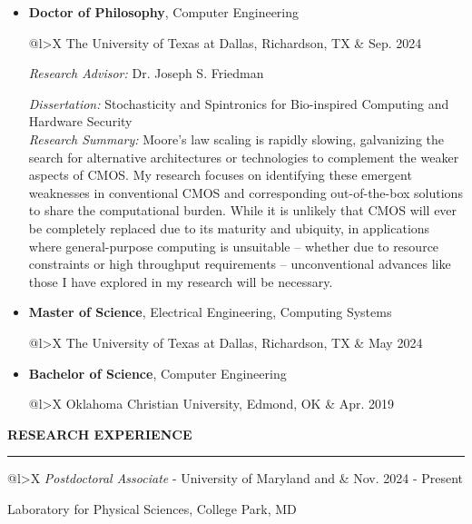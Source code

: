 \documentclass[12pt]{article}
\begin{document}
\begin{itemize}
    \item \textbf{Doctor of Philosophy}, Computer Engineering\\
    \begin{tabularx}{\linewidth}{{@{}l>{\raggedleft\arraybackslash}X}}
    The University of Texas at Dallas, Richardson, TX & Sep. 2024
    \end{tabularx}

    \textit{Research Advisor:} Dr. Joseph S. Friedman

    \textit{Dissertation:} Stochasticity and Spintronics for Bio-inspired Computing and Hardware Security\\
    \textit{Research Summary:} Moore’s law scaling is rapidly slowing, galvanizing the search for alternative architectures or technologies to complement the weaker aspects of CMOS.  My research focuses on identifying these emergent weaknesses in conventional CMOS and corresponding out-of-the-box solutions to share the computational burden.  While it is unlikely that CMOS will ever be completely replaced due to its maturity and ubiquity, in applications where general-purpose computing is unsuitable -- whether due to resource constraints or high throughput requirements -- unconventional advances like those I have explored in my research will be necessary.
    
    \item \textbf{Master of Science}, Electrical Engineering, Computing Systems\\
    \begin{tabularx}{\linewidth}{{@{}l>{\raggedleft\arraybackslash}X}}
  The University of Texas at Dallas, Richardson, TX     & May 2024 
    \end{tabularx}
    
    \item \textbf{Bachelor of Science}, Computer Engineering\\
    \begin{tabularx}{\linewidth}{{@{}l>{\raggedleft\arraybackslash}X}}
  Oklahoma Christian University, Edmond, OK & Apr. 2019 
    \end{tabularx}
\end{itemize}

\newpage

{\Large \textbf{RESEARCH EXPERIENCE}}

\textcolor{gray}{\rule{\textwidth}{2pt}}

\begin{tabularx}{\linewidth}{{@{}l>{\raggedleft\arraybackslash}X}}
  \textit{Postdoctoral Associate} - University of Maryland and      & Nov. 2024 - Present 
    \end{tabularx}
    Laboratory for Physical Sciences, College Park, MD
    \vspace{0.5em}
    
\end{document}
